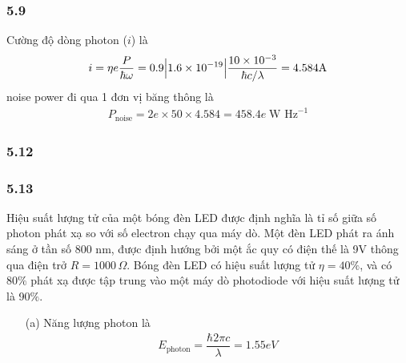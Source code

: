 \documentclass{article}
\newcommand{\f}[2]{\dfrac{#1}{#2}}
\begin{document}
\subsubsection*{5.9}
Cường độ dòng photon ($i$) là
\begin{align*}
	i = \eta e \f{P}{\hbar \omega} = 0.9 \abs{1.6\times 10^{-19}} \f{10 \times 10^{-3}}{\hbar c / \lambda} = 4.584 \text{A}
\end{align*}
noise power đi qua 1 đơn vị băng thông là 
\begin{align*}
	P_{\text{noise}} = 2e \times 50 \times 4.584  = 458.4e \; \text{W Hz}^{-1}
\end{align*}
\subsubsection*{5.12}
\subsubsection*{5.13}
Hiệu suất lượng tử của một bóng đèn LED được định nghĩa là tỉ số giữa số photon phát xạ so với số electron chạy qua máy dò. Một đèn LED phát ra ánh sáng ở tần số 800 nm, được định hướng bởi một ắc quy có điện thế là 9V thông qua điện trở $R = 1000 \, \Omega$. Bóng đèn LED có hiệu suất lượng tử $\eta = 40\%$, và có $80\%$ phát xạ được tập trung vào một máy dò photodiode với hiệu suất lượng tử là 90$\%$.
\begin{enumerate}
	\item[(a)] Năng lượng photon là
	\begin{align*}
		E_{\text{photon}} = \f{\hbar 2 \pi c}{\lambda} = 1.55eV
	\end{align*}
\end{enumerate}
\end{document}
